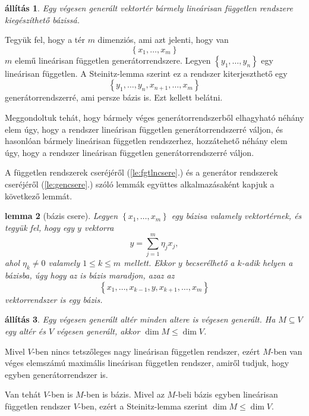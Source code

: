 \documentclass[9pt, a4paper, showtrims]{memoir}
\makeatletter
\renewenvironment{proof}[1][\proofname]
    {\par\pushQED{\qed}%
    \normalfont \topsep6\p@\@plus6\p@\relax
    \trivlist
    \item[\hskip\labelsep
        \itshape
    #1\@addpunct{:}]\ignorespaces}
    {\popQED\endtrivlist\@endpefalse}
\theoremstyle{plain}
\newtheorem{proposition}{állítás}[chapter]
\newtheorem{lemma}[proposition]{lemma}
\theoremstyle{remark}
\theoremstyle{definition}
\makeatother
\begin{document}
\begin{proposition}
    Egy végesen generált vektortér bármely lineárisan független rendszere kiegészíthető bázissá.
    \label{pr:lfgtenbazissa}
\end{proposition}
\begin{proof}
    Tegyük fel, hogy a tér $m$ dimenziós, ami azt jelenti, hogy van 
    \[
        \left\{ x_1,\dots,x_m \right\}
    \]
    $m$ elemű lineárisan független generátorrendszere.
    Legyen $\left\{ y_1,\dots,y_n \right\}$ egy lineárisan független.
    A Steinitz-lemma szerint ez a rendszer kiterjeszthető egy 
    \[
        \left\{ y_1,\dots,y_n,x_{n+1},\dots,x_m \right\}
    \]
    generátorrendszerré, ami persze bázis is.
    Ezt kellett belátni. 
\end{proof}

Meggondoltuk tehát, hogy bármely véges generátorrendszerből elhagyható néhány elem úgy, 
hogy a rendszer lineárisan független generátorrendszerré váljon,
és hasonlóan bármely lineárisan független rendszerhez, hozzátehető néhány elem úgy, hogy a
rendszer lineárisan független generátorrendszerré váljon.

A független rendszerek cseréjéről (\ref{le:fgtlncsere}.) és a generátor rendszerek cseréjéről (\ref{le:gencsere}.) szóló lemmák 
együttes alkalmazásaként kapjuk a következő lemmát.

\begin{lemma}[bázis csere]\label{le:baziscsere}
    Legyen $\left\{ x_1,\dots,x_m \right\}$ egy bázisa valamely vektortérnek,
    és tegyük fel, 
    hogy egy $y$ vektorra
    \[
        y=\sum_{j=1}^m\eta_jx_j,
    \]
    ahol $\eta_k\neq 0$ valamely $1\leq k\leq m$ mellett. 
    Ekkor $y$ becserélhető a $k$-adik helyen a bázisba, 
    úgy hogy az is bázis maradjon, azaz az
    \[
        \left\{ x_1,\dots,x_{k-1},y,x_{k+1},\dots,x_m \right\}
    \]
    vektorrendszer is egy bázis.
\end{lemma}

\begin{proposition}
    Egy végesen generált altér minden altere is végesen generált.
    Ha $M\subseteq V$ egy altér és $V$ végesen generált,
    akkor $\dim M\leq \dim V$.
\end{proposition}
\begin{proof}
    Mivel $V$-ben nincs tetszőleges nagy lineárisan független rendszer,
    ezért $M$-ben van véges elemszámú maximális lineárisan független rendszer,
    amiről tudjuk, hogy egyben generátorrendszer is.

    Van tehát $V$-ben is $M$-ben is bázis.
    Mivel az $M$-beli bázis egyben lineárisan független rendszer $V$-ben,
    ezért a Steinitz-lemma  szerint $\dim M\leq\dim V$.
\end{proof}
\end{document}
